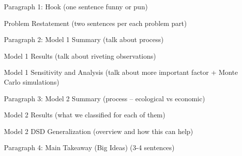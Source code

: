 Paragraph 1:
  Hook (one sentence funny or pun)

  Problem Restatement (two sentences per each problem part)

Paragraph 2:
  Model 1 Summary (talk about process)

  Model 1 Results (talk about riveting observations)

  Model 1 Sensitivity and Analysis (talk about more important factor + Monte Carlo simulations)

Paragraph 3:
  Model 2 Summary (process -- ecological vs economic)

  Model 2 Results (what we classified for each of them)

  Model 2 DSD Generalization (overview and how this can help)

Paragraph 4:
  Main Takeaway (Big Ideas) (3-4 sentences)